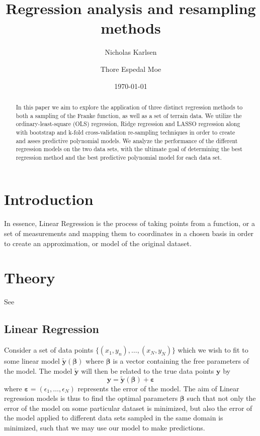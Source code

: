 \documentclass[reprint, english, nofootinbib]{revtex4-2}
\begin{document}
\title{Regression analysis and resampling methods}
\author{Nicholas Karlsen}
\author{Thore Espedal Moe}
\date{\today}

\begin{abstract}
    \noindent
   In this paper we aim to explore the application of three distinct regression methods to both a sampling of the Franke function, as well as a set of terrain data. We utilize the ordinary-least-square (OLS) regression, Ridge regression and LASSO regression along with bootstrap and k-fold cross-validation re-sampling techniques in order to create and asses predictive polynomial models. We analyze the performance of the different regression models on the two data sets, with the ultimate goal of determining the best regression method and the best predictive polynomial model for each data set.
\end{abstract}

\maketitle

\section{Introduction}
    \noindent
    In essence, Linear Regression is the process of taking points from a function, or a set of measurements and mapping them to coordinates in a chosen basis in order to create an approximation, or model of the original dataset.
\section{Theory}
    See \textcite{hastie}
    \subsection{Linear Regression}
        \noindent
        Consider a set of data points $\{(x_1, y_n), \dots, (x_N, y_N)\}$ which we wish to fit to some linear model $\mathbf{\tilde y}(\pmb \beta)$ where $\pmb\beta$ is a vector containing the free parameters of the model. The model $\mathbf{\tilde y}$ will then be related to the true data points $\mathbf y$ by
        \begin{equation}
            \mathbf y = \mathbf{\tilde y}(\pmb\beta) + \pmb\varepsilon
        \end{equation}
        where $\pmb\varepsilon = (\epsilon_1, \dots, \epsilon_N)$ represents the error of the model. The aim of Linear regression models is thus to find the optimal parameters $\pmb\beta$ such that not only the error of the model on some particular dataset is minimized, but also the error of the model applied to different data sets sampled in the same domain is minimized, such that we may use our model to make predictions.
\end{document}
